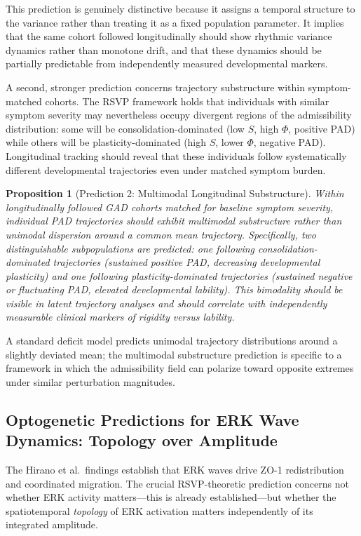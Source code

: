 \documentclass[11pt,a4paper]{article}
\theoremstyle{plain}
\newtheorem{proposition}[theorem]{Proposition}
\theoremstyle{definition}
\begin{document}
This prediction is genuinely distinctive because it assigns a temporal structure to
the variance rather than treating it as a fixed population parameter. It implies that
the same cohort followed longitudinally should show rhythmic variance dynamics rather
than monotone drift, and that these dynamics should be partially predictable from
independently measured developmental markers.

A second, stronger prediction concerns trajectory substructure within
symptom-matched cohorts. The RSVP framework holds that individuals with similar symptom severity may
nevertheless occupy divergent regions of the admissibility distribution: some will be
consolidation-dominated (low $S$, high $\Phi$, positive PAD) while others will be
plasticity-dominated (high $S$, lower $\Phi$, negative PAD). Longitudinal tracking
should reveal that these individuals follow systematically different developmental
trajectories even under matched symptom burden.

\begin{proposition}[Prediction 2: Multimodal Longitudinal Substructure]
Within longitudinally followed GAD cohorts matched for baseline symptom severity,
individual PAD trajectories should exhibit multimodal substructure rather than unimodal
dispersion around a common mean trajectory. Specifically, two distinguishable subpopulations
are predicted: one following consolidation-dominated trajectories (sustained positive
PAD, decreasing developmental plasticity) and one following plasticity-dominated
trajectories (sustained negative or fluctuating PAD, elevated developmental lability).
This bimodality should be visible in latent trajectory analyses and should correlate
with independently measurable clinical markers of rigidity versus lability.
\end{proposition}

A standard deficit model predicts unimodal trajectory distributions around a slightly
deviated mean; the multimodal substructure prediction is specific to a framework in which
the admissibility field can polarize toward opposite extremes under similar perturbation
magnitudes.

\subsection{Optogenetic Predictions for ERK Wave Dynamics: Topology over Amplitude}

The Hirano et al.\ findings establish that ERK waves drive ZO-1 redistribution and
coordinated migration. The crucial RSVP-theoretic prediction concerns not whether ERK
activity matters---this is already established---but whether the spatiotemporal
\emph{topology} of ERK activation matters independently of its integrated amplitude.
\end{document}
